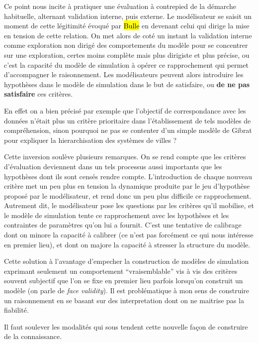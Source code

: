 Ce point nous incite à pratiquer une évaluation à contrepied de la démarche habituelle, alternant validation interne, puis externe. Le modélisateur se saisit un moment de cette légitimité évoqué par \hl{Bulle} en devenant celui qui dirige la mise en tension de cette relation. On met alors de coté un instant la validation interne comme exploration non dirigé des comportements du modèle pour se concentrer sur une exploration, certes moins complète mais plus dirigiste et plus précise, ou c'est la capacité du modèle de simulation à opérer ce rapprochement qui permet d'accompagner le raisonnement. Les modélisateurs peuvent alors introduire les hypothèses dans le modèle de simulation dans le but de satisfaire, ou \textbf{de ne pas satisfaire} ces critères.

En effet on a bien précisé par exemple que l'objectif de correspondance avec les données n'était plus un critère prioritaire dans l'établissement de tels modèles de compréhension, sinon pourquoi ne pas se contenter d'un simple modèle de Gibrat pour expliquer la hierarchisation des systèmes de villes ? 

Cette inversion soulève plusieurs remarques. On se rend compte que les critères d'évaluation deviennent dans un tels processus aussi importants que les hypothèses dont ils sont censés rendre compte. L'introduction de chaque nouveau critère met un peu plus en tension la dynamique produite par le jeu d'hypothèse proposé par le modélisateur, et rend donc un peu plus difficile ce rapprochement. Autrement dit, le modélisateur pose les questions par les critères qu'il mobilise, et le modèle de simulation tente ce rapprochement avec les hypothèses et les contraintes de paramètres qu'on lui a fournit. C'est une tentative de calibrage dont on minore la capacité à calibrer (ce n'est pas forcément ce qui nous intéresse en premier lieu), et dont on majore la capacité à stresser la structure du modèle.

Cette solution à l'avantage d'empecher la construction de modèles de simulation exprimant seulement un comportement \enquote{vraisemblable} vis à vis des critères souvent subjectif que l'on se fixe en premier lieu parfois lorsqu'on construit un modèle (on parle de \textit{face validity}). Il est problématique à mon sens de construire un raisonnement en se basant sur des interpretation dont on ne maitrise pas la fiabilité. 

Il faut soulever les modalités qui sous tendent cette nouvelle façon de construire de la connaissance.

